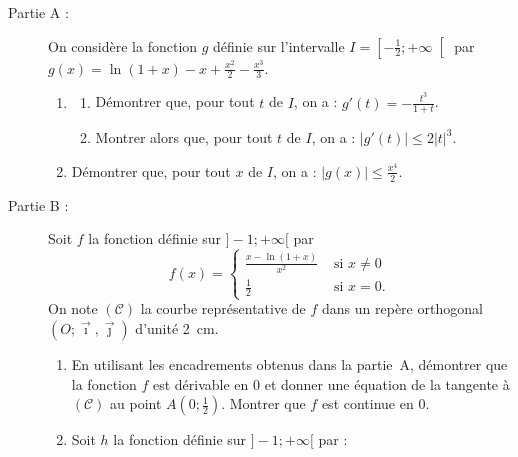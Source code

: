 \begin{exo}
      \begin{description}
            \item[Partie A :]
                  On consid\`ere la fonction $g$ d\'efinie sur l'intervalle
                  $I = \left[ -\frac{1}{2} ; +\infty \right[$ par 
                  $g(x) = \ln (1+x) - x + \frac{x^2}{2} - \frac{x^3}{3}$.
                  \begin{enumerate}
                        \item \begin{enumerate}
                                    \item D\'emontrer que, pour tout $t$ de $I$, on a : $g'(t) = - \frac{t^3}{1 + t}$.
                                    \item Montrer alors que, pour tout $t$ de $I$, on a : 
                                          $\left| g'(t) \right| \leq 2 |t|^3$.
                              \end{enumerate}
                        \item D\'emontrer que, pour tout $x$ de $I$, on a :
                              $|g(x)| \leq \frac{x^4}{2}$.
                  \end{enumerate}
            \item[Partie B :]
                  Soit $f$ la fonction d\'efinie sur $]-1 ; +\infty[$ par 
                  \[
                        f(x) = 
                        \left\lbrace
                              \begin{array}{ll}
                                    \frac{x-\ln(1+x)}{x^2} & \text{ si } x \neq 0 \\
                                    \frac{1}{2} & \text{ si } x = 0.
                              \end{array}
                        \right.
                  \]
                  On note $(\mathscr{C})$ la courbe repr\'esentative de $f$ dans un rep\`ere orthogonal $(O ; \vec{\imath} , \vec{\jmath})$ d'unit\'e 2~cm.
                  \begin{enumerate}
                        \item En utilisant les encadrements obtenus dans la partie~A, d\'emontrer que la fonction 
                              $f$ est d\'erivable en $0$ et donner une \'equation de la tangente \`a $(\mathscr{C})$ au point $A(0 ; \frac{1}{2})$.
                              Montrer que $f$ est continue en $0$.
                        \item Soit $h$ la fonction d\'efinie sur $]-1 ; +\infty[$ par : 

\end{enumerate}
\end{description}
\end{exo}
